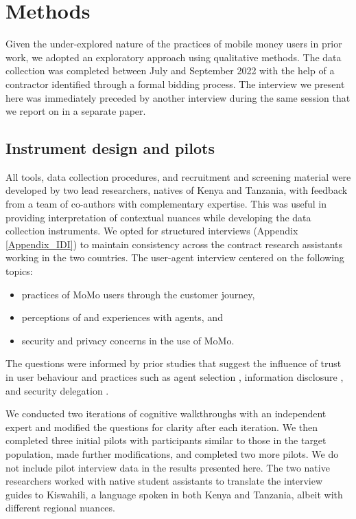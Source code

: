 \section{Methods}
\label {Sec:methodology}
Given the under-explored nature of the practices of mobile money users in prior work, we adopted an exploratory approach using qualitative methods. The data collection was completed between July and September 2022 with the help of a contractor identified through a formal bidding process. 
The interview we present here was immediately preceded by another interview during the same session that we report on in a separate paper. 

\subsection {Instrument design and pilots}
All tools, data collection procedures, and recruitment and screening material were developed by two lead researchers, natives of Kenya and Tanzania, with feedback from a team of co-authors with complementary expertise. This was useful in providing  interpretation of contextual nuances while developing the data collection instruments. We opted for structured interviews (Appendix \ref{Appendix_IDI}) to maintain consistency across the contract research assistants working in the two countries. The user-agent interview centered on the following topics: 
\begin{itemize}
    \item practices of MoMo users through the customer journey,
    \item perceptions of and experiences with agents, and
    \item security and privacy concerns in the use of MoMo.
\end{itemize}  

The questions were informed by prior studies that suggest the influence of trust in user behaviour and  practices such as agent selection \cite{chamboko2021role}, information disclosure \cite{yisa2023investigating}, and security delegation \cite{forget2016or}.

We conducted two iterations of cognitive walkthroughs with an independent expert and modified the questions for clarity after each iteration. We then completed three initial pilots with participants similar to  those in the target population, made further modifications, and completed two more pilots. We do not include pilot interview data in the results presented here. The two native researchers worked with native student assistants to translate the interview guides to Kiswahili, a language spoken in both Kenya and Tanzania, albeit with different regional nuances. 

